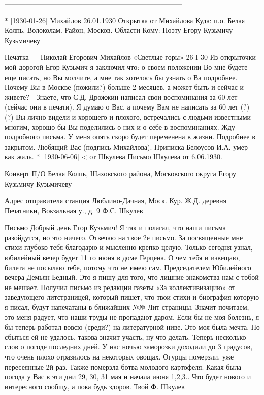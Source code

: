 \documentclass[]{memoir}
\begin{document}
---------------------------------------------------------------------------

* [1930-01-26] Михайлов
26.01.1930
Открытка от Михайлова
Куда: п.о. Белая Колпь, Волоколам. Район, Москов. Области
Кому: Поэту Егору Кузьмичу Кузьмичеву

Печатка — Николай Егорович Михайлов 
«Светлые горы» 26-I-30
Из открыточки мой дорогой Егор Кузьмич я заключил что: о своем положении Во мне будете еще писать, но Вы молчите, а мне так хотелось бы узнать о Ва  подробнее. Почему Вы в Москве (пожили?) больше 2 месяцев, а может быть и сейчас и живете? - Знаете, что С.Д. Дрожжин написал свои воспоминания за 60 лет (сейчас они  в печати).
Я думаю о Вас, а почему  Вам не написать за 60 лет (?) (?) Вы лично видели и хорошего и плохого, встречались с людьми известными многим, хорошо бы Вы поделились о них и о себе в воспоминаниях. Жду подробного письма. У меня опять скоро будет переменена в жизни. Подробнее в закрытом. Любящий Вас (подпись Михайлова).
Приписка
Белоусов И.А. умер — как жаль.
* [1930-06-06] < от Шкулева
Письмо Шкулева от 6.06.1930.


Конверт
П/О Белая Колпь, Шаховского района, Московского округа
Егору Кузьмичу Кузьмичеву

Адрес отправителя
станция Люблино-Дачная, Моск. Кур. Ж.Д. деревня Печатники, Вокзальная у., д. 9 Ф.С. Шкулев


Письмо
Добрый день 
Егор Кузьмич!
Я так и полагал, что наши письма разойдутся, но это ничего. Отвечаю на твое 2е письмо. За посвященные мне стихи глубоко тебя благодарю и мысленно крепко целую. Только сегодня узнал, юбилейный вечер будет 11 го июня в доме Герцена. О чем тебя и извещаю, билета не посылаю тебе, потому что не имею сам.
Председателем Юбилейного вечера Демьян Бедный. Это я пишу для того, что лишние знакомства нам с тобой не мешает. 
Получил письмо из редакции газеты «За коллективизацию» от заведующего литстраницей, который пишет, что твои стихи и биография которую я писал, будут напечатаны в ближайших №№ Лит-страницы. Значит почитаем, это меня радует, что наши труды не пропадают даром.
Если бы не моя болезнь, я бы теперь работал вовсю (среди?) на литературной ниве. Это моя была мечта. Но сбыться ей не удалось, такова значит участь, ну что делать.
Теперь несколько слов о погоде последних дней. У нас ночью заморозки доходили до 3 градусов, что очень плохо отразилось на некоторых овощах. Огурцы померзли, уже пересеянные 2й раз. Также померзла ботва молодого картофеля. Какая была погода у Вас в эти дни 29, 30, 31 мая и начала июня 1,2,3..
Что будет нового и интересного сообщу, а пока будь здоров.
Твой Ф. Шкулев
\end{document}
